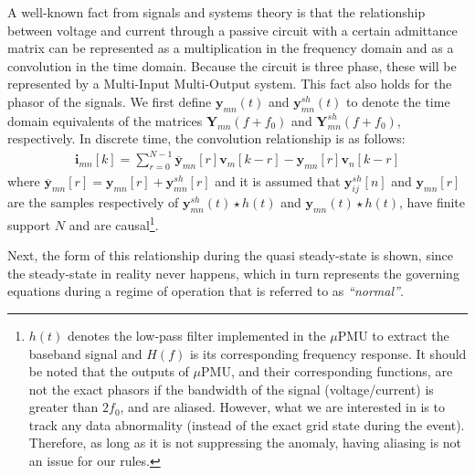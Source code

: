 \documentclass[twocolumn]{IEEEtran}
\newcommand{\mup}{\mu \text{PMU}}
\newcommand{\bs}{\boldsymbol}
\begin{document}
A well-known fact from signals and systems theory is that the relationship between voltage and current through a passive circuit with a certain admittance matrix can be represented as a multiplication in the frequency domain and as a convolution in the time domain. Because the circuit is three phase, these will be represented by a Multi-Input Multi-Output system. This fact also holds for the phasor of the signals. We first define $\bs{y}_{mn}(t)$ and $\bs{y}^{sh}_{mn}(t)$ to denote the time domain equivalents of the matrices $\bs{Y}_{mn}(f+f_0)$ and $\bs{Y}^{sh}_{mn}(f+f_0)$, respectively.  
In discrete time, the convolution relationship is as follows:
\begin{align}
 \mathbf{i}_{mn}[k]=\sum_{r=0}^{N-1} \overline{\bs y}_{mn}[r] \mathbf{v}_m[k-r]-\bs{y}_{mn}[r]\mathbf{v}_n[k-r]
\label{eq:basiceq}
\end{align}
where $\overline{\bs y}_{mn}[r]=\bs{y}_{mn}[r]+\bs{y}^{sh}_{mn}[r]$ and it is assumed that $\bs{y}^{sh}_{ij}[n]$ and $\bs{y}_{mn}[r]$ are the samples respectively of  $\bs{y}^{sh}_{mn}(t)\star h(t)$ and $\bs{y}_{mn}(t)\star h(t)$, have finite support $N$ and are causal\footnote{$h(t)$ denotes the low-pass filter implemented in the $\mup$ to extract the baseband signal and $H(f)$ is its corresponding frequency response.
It should be noted that the outputs of  $\mup$, and their corresponding functions, are not the exact phasors if the bandwidth of the signal (voltage/current) is greater than $2f_0$, and are aliased. However, what we are interested in is to track any data abnormality (instead of the exact grid state during the event). Therefore,  as long as it is not suppressing the anomaly, having aliasing is not an issue for our rules.    
}. 

Next, the form of this relationship during the quasi steady-state is shown, since the steady-state in reality never happens, which in turn represents the governing equations during a regime of operation that is referred to as \textit{``normal''}. 
\end{document}
